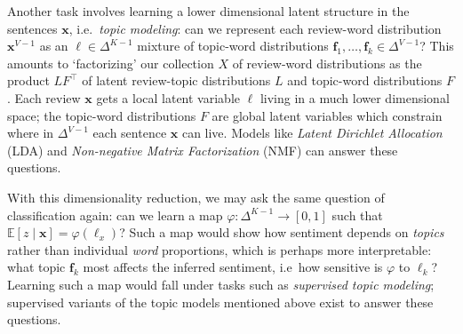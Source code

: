 \documentclass[12pt]{article}
\begin{document}
Another task involves learning a lower dimensional latent structure in the
sentences $\bm{x}$, i.e.\ \emph{topic modeling}: can we represent each
review-word distribution $\bm{x}^{V - 1}$ as an $\bm{\ell} \in \Delta^{K - 1}$
mixture of topic-word distributions $\bm{f}_1, \dots, \bm{f}_k \in \Delta^{V -
1}$?
This amounts to `factorizing' our collection $X$ of review-word distributions
as the product $LF^\top$ of latent review-topic distributions $L$ and
topic-word distributions $F$.
Each review $\bm{x}$ gets a local latent variable $\bm{\ell}$ living in a much
lower dimensional space; the topic-word distributions $F$ are global latent
variables which constrain where in $\Delta^{V - 1}$ each sentence $\bm{x}$ can
live.
Models like \emph{Latent Dirichlet Allocation} (LDA) and \emph{Non-negative
Matrix Factorization} (NMF) can answer these questions.

With this dimensionality reduction, we may ask the same question of
classification again: can we learn a map $\varphi\colon \Delta^{K - 1} \to [0,
1]$ such that $\mathbb{E}[z\mid \bm{x}] = \varphi(\bm{\ell}_x)$?
Such a map would show how sentiment depends on \emph{topics} rather than
individual \emph{word} proportions, which is perhaps more interpretable: what
topic $\bm{f}_k$ most affects the inferred sentiment, i.e\ how sensitive is
$\varphi$ to $\ell_k$?
Learning such a map would fall under tasks such as \emph{supervised topic
modeling}; supervised variants of the topic models mentioned above exist to
answer these questions.



















% 

% 

% 
\end{document}
